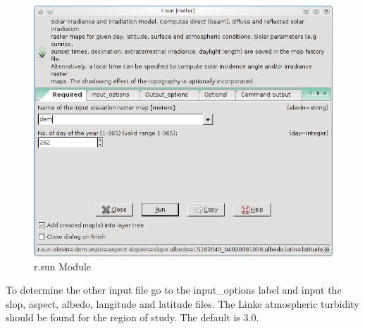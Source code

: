 \begin{figure}[htbp]
   \centering
   \includegraphics[scale=0.4]{gipe022.png}
   \caption{r.sun Module}
   \label{fig:gipe022}
\end{figure}

To determine the other input file go to the input\_options label and input the slop, aspect, albedo, langitude and latitude files. The Linke atmospheric turbidity should be found for the region of study. The default is 3.0.\newline

